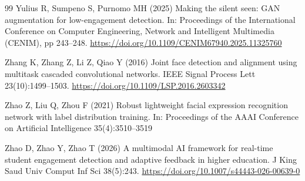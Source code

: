 \documentclass[pdflatex,iicol,sn-basic]{sn-jnl}
\begin{document}
\begin{thebibliography}{99}
Yulius R, Sumpeno S, Purnomo MH (2025) Making the silent seen: GAN augmentation for low-engagement detection. In: Proceedings of the International Conference on Computer Engineering, Network and Intelligent Multimedia (CENIM), pp 243--248. \url{https://doi.org/10.1109/CENIM67940.2025.11325760}

Zhang K, Zhang Z, Li Z, Qiao Y (2016) Joint face detection and alignment using multitask cascaded convolutional networks. IEEE Signal Process Lett 23(10):1499--1503. \url{https://doi.org/10.1109/LSP.2016.2603342}

Zhao Z, Liu Q, Zhou F (2021) Robust lightweight facial expression recognition network with label distribution training. In: Proceedings of the AAAI Conference on Artificial Intelligence 35(4):3510--3519

Zhao D, Zhao Y, Zhao T (2026) A multimodal AI framework for real-time student engagement detection and adaptive feedback in higher education. J King Saud Univ Comput Inf Sci 38(5):243. \url{https://doi.org/10.1007/s44443-026-00639-0}

\end{thebibliography}
\end{document}
